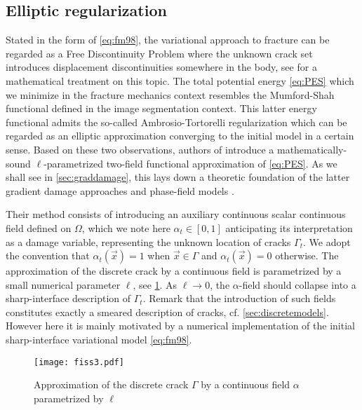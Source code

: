 \subsection{Elliptic regularization} \label{sec:ellipticregul}
Stated in the form of \eqref{eq:fm98}, the variational approach to fracture can be regarded as a Free Discontinuity Problem where the unknown crack set introduces displacement discontinuities somewhere in the body, see \cite{Braides:1998aa} for a mathematical treatment on this topic. The total potential energy \eqref{eq:PES} which we minimize in the fracture mechanics context resembles the Mumford-Shah functional \cite{Mumford:1989aa} defined in the image segmentation context. This latter energy functional admits the so-called Ambrosio-Tortorelli regularization \cite{Ambrosio:1990aa} which can be regarded as an elliptic approximation converging to the initial model in a certain sense. Based on these two observations, authors of \cite{BourdinFrancfortMarigo:2000} introduce a mathematically-sound $\ell$-parametrized two-field functional approximation of \eqref{eq:PES}. As we shall see in \cref{sec:graddamage}, this lays down a theoretic foundation of the latter gradient damage approaches \cite{PhamAmorMarigoMaurini:2011} and phase-field models \cite{MieheHofackerWelschinger:2010}.

Their method consists of introducing an auxiliary continuous scalar continuous field defined on $\Omega$, which we note here $\alpha_t\in[0,1]$ anticipating its interpretation as a damage variable, representing the unknown location of cracks $\Gamma_t$. We adopt the convention that $\alpha_t(\vec{x})=1$ when $\vec{x}\in\Gamma$ and $\alpha_t(\vec{x})=0$ otherwise. The approximation of the discrete crack by a continuous field is parametrized by a small numerical parameter $\ell$, see \cref{fig:fiss3}. As $\ell\to 0$, the $\alpha$-field should collapse into a sharp-interface description of $\Gamma_t$. Remark that the introduction of such fields constitutes exactly a smeared description of cracks, cf. \cref{sec:discretemodels}. However here it is mainly motivated by a numerical implementation of the initial sharp-interface variational model \eqref{eq:fm98}.
\begin{figure}[htbp]
\centering
\texttt{[image: fiss3.pdf]}
\caption{Approximation of the discrete crack $\Gamma$ by a continuous field $\alpha$ parametrized by $\ell$} \label{fig:fiss3}
\end{figure}


